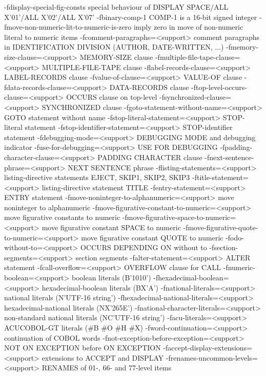   -fdisplay-special-fig-consts	special behaviour of DISPLAY SPACE/ALL X'01'/ALL X'02'/ALL X'07'
  -fbinary-comp-1        COMP-1 is a 16-bit signed integer
  -fmove-non-numeric-lit-to-numeric-is-zero	imply zero in move of non-numeric literal to numeric items
  -fcomment-paragraphs=<support>	comment paragraphs in IDENTIFICATION DIVISION (AUTHOR, DATE-WRITTEN, ...)
  -fmemory-size-clause=<support>	MEMORY-SIZE clause
  -fmultiple-file-tape-clause=<support>	MULTIPLE-FILE-TAPE clause
  -flabel-records-clause=<support>	LABEL-RECORDS clause
  -fvalue-of-clause=<support>	VALUE-OF clause
  -fdata-records-clause=<support>	DATA-RECORDS clause
  -ftop-level-occurs-clause=<support>	OCCURS clause on top-level
  -fsynchronized-clause=<support>	SYNCHRONIZED clause
  -fgoto-statement-without-name=<support>	GOTO statement without name
  -fstop-literal-statement=<support>	STOP-literal statement
  -fstop-identifier-statement=<support>	STOP-identifier statement
  -fdebugging-mode=<support>	DEBUGGING MODE and debugging indicator
  -fuse-for-debugging=<support>	USE FOR DEBUGGING
  -fpadding-character-clause=<support>	PADDING CHARACTER clause
  -fnext-sentence-phrase=<support>	NEXT SENTENCE phrase
  -flisting-statements=<support>	listing-directive statements EJECT, SKIP1, SKIP2, SKIP3
  -ftitle-statement=<support>	listing-directive statement TITLE
  -fentry-statement=<support>	ENTRY statement
  -fmove-noninteger-to-alphanumeric=<support>	move noninteger to alphanumeric
  -fmove-figurative-constant-to-numeric=<support>	move figurative constants to numeric
  -fmove-figurative-space-to-numeric=<support>	move figurative constant SPACE to numeric
  -fmove-figurative-quote-to-numeric=<support>	move figurative constant QUOTE to numeric
  -fodo-without-to=<support>	OCCURS DEPENDING ON without to
  -fsection-segments=<support>	section segments
  -falter-statement=<support>	ALTER statement
  -fcall-overflow=<support>	OVERFLOW clause for CALL
  -fnumeric-boolean=<support>	boolean literals (B'1010')
  -fhexadecimal-boolean=<support>	hexadecimal-boolean literals (BX'A')
  -fnational-literals=<support>	national literals (N'UTF-16 string')
  -fhexadecimal-national-literals=<support>	hexadecimal-national literals (NX'265E')
  -fnational-character-literals=<support>	non-standard national literals (NC'UTF-16 string')
  -facu-literals=<support>	ACUCOBOL-GT literals (#B #O #H #X)
  -fword-continuation=<support>	continuation of COBOL words
  -fnot-exception-before-exception=<support>	NOT ON EXCEPTION before ON EXCEPTION
  -faccept-display-extensions=<support>	extensions to ACCEPT and DISPLAY
  -frenames-uncommon-levels=<support>	RENAMES of 01-, 66- and 77-level items
